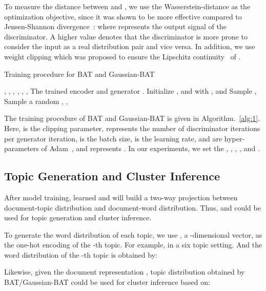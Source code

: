 \documentclass[11pt,a4paper]{article}
\begin{document}
To measure the distance between  and , we use the Wasserstein-distance as the optimization objective, since it was shown to be more effective compared to Jensen-Shannon divergence~\cite{arjovsky2017wasserstein}: 
where  represents the output signal of the discriminator. A higher value denotes that the discriminator is more prone to consider the input as a real distribution pair and vice versa. In addition, we use weight clipping which was proposed to ensure the Lipschitz continuity~\cite{arjovsky2017wasserstein} of .\begin{algorithm}[!h]
	\renewcommand{\algorithmicrequire}{\textbf{Input:}}
	\renewcommand{\algorithmicensure}{\textbf{Output:}}
\caption{Training procedure for BAT and Gaussian-BAT}
	\label{alg:1}
	\begin{algorithmic}[1]
		\REQUIRE , , , , , , 
		\ENSURE The trained encoder  and generator .
		\STATE Initialize ,  and  with ,  and 
		\FOR{}
		\FOR{}
		\STATE Sample , 
		\STATE Sample a random   
		\STATE , 
		\STATE , 
		\STATE {\color{black}}
		\ENDFOR
		\STATE 
		\STATE {\color{black}}
		\ENDFOR
		\STATE 
		\STATE 
		\ENDWHILE 	
	\end{algorithmic}
\end{algorithm}

The training procedure of BAT and Gaussian-BAT is given in Algorithm.~\ref{alg:1}. Here,  is the clipping parameter,  represents the number of discriminator iterations per generator iteration,  is the batch size,  is the learning rate,  and  are hyper-parameters of Adam~\cite{kingma2014adam}, and  represents . In our experiments, we set the , , , ,  and .




\subsection{Topic Generation and Cluster Inference}

After model training, learned  and  will build a two-way projection between document-topic distribution and document-word distribution. Thus,  and  could be used for topic generation and cluster inference. 

To generate the word distribution of each topic, we use , a -dimensional vector, as the one-hot encoding of the -th topic.  For example,  in a six topic setting.  And the word distribution of the -th topic is obtained by:
 
Likewise,  given the document representation , topic distribution  obtained by BAT/Gaussian-BAT could be used for cluster inference based on:
\end{document}

